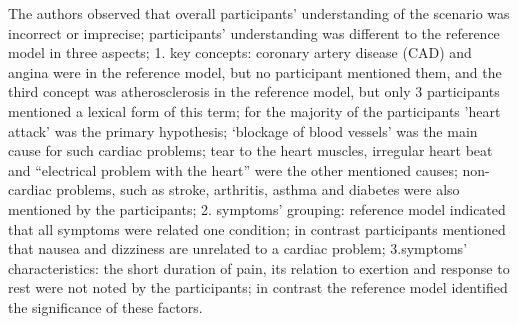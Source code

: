 \documentclass[]{article}
\begin{document}
The authors observed that overall participants’ understanding of the scenario was incorrect or imprecise; participants' understanding was different to the reference model in three aspects; 1. key concepts: coronary artery disease (CAD) and angina were in the reference model, but no participant mentioned them, and the third concept was atherosclerosis in the reference model, but only 3 participants mentioned a lexical form of this term; for the majority of the participants 'heart attack' was the primary hypothesis; ‘blockage of blood vessels’ was the main cause for such cardiac problems; tear to the heart muscles, irregular heart beat and “electrical problem with the heart” were the other mentioned causes;  non-cardiac problems, such as stroke, arthritis, asthma and diabetes were also mentioned by the participants; 2. symptoms’ grouping: reference model indicated that all symptoms were related one condition; in contrast participants mentioned that nausea and dizziness are unrelated to a cardiac problem; 3.symptoms’ characteristics: the short duration of pain, its relation to exertion and response to rest were not noted by the participants; in contrast the reference model identified the significance of these factors. 
\end{document}
